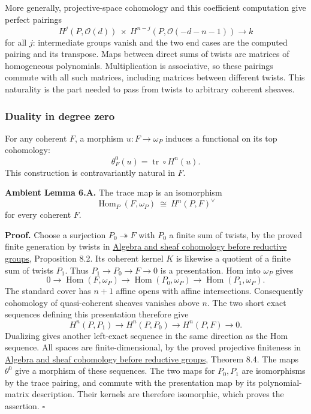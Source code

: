\documentclass[11pt,a4paper,openany]{report}
\begin{document}
More generally, projective-space cohomology and this coefficient computation give perfect pairings \[
H^j(P,\mathcal O(d))\ \times\
H^{n-j}(P,\mathcal O(-d-n-1))\longrightarrow k
\] for all \(j\): intermediate groups vanish and the two end cases are the computed pairing and its transpose. Maps between direct sums of twists are matrices of homogeneous polynomials. Multiplication is associative, so these pairings commute with all such matrices, including matrices between different twists. This naturality is the part needed to pass from twists to arbitrary coherent sheaves.

\subsubsection{Duality in degree zero}\label{AG-RG-S02-duality-in-degree-zero}

For any coherent \(F\), a morphism \(u:F\to\omega_P\) induces a functional on its top cohomology: \[
\theta_F^0(u)=\operatorname{tr}\circ H^n(u).
\] This construction is contravariantly natural in \(F\).

\textbf{Ambient Lemma 6.A.} The trace map is an isomorphism \[
\operatorname{Hom}_P(F,\omega_P)
 \ \cong\ H^n(P,F)^\vee
\] for every coherent \(F\).

\textbf{Proof.} Choose a surjection \(P_0\twoheadrightarrow F\) with \(P_0\) a finite sum of twists, by the proved finite generation by twists in \href{https://github.com/KokunoYumeto/open-math-courses/blob/main/docs/courses/AG-RG/AG-RG-S01.md}{Algebra and sheaf cohomology before reductive groups}, Proposition 8.2. Its coherent kernel \(K\) is likewise a quotient of a finite sum of twists \(P_1\). Thus \(P_1\to P_0\to F\to0\) is a presentation. Hom into \(\omega_P\) gives \[
0\to\operatorname{Hom}(F,\omega_P)
 \to\operatorname{Hom}(P_0,\omega_P)
 \to\operatorname{Hom}(P_1,\omega_P).
\] The standard cover has \(n+1\) affine opens with affine intersections. Consequently cohomology of quasi-coherent sheaves vanishes above \(n\). The two short exact sequences defining this presentation therefore give \[
H^n(P,P_1)\to H^n(P,P_0)\to H^n(P,F)\to0.
\] Dualizing gives another left-exact sequence in the same direction as the Hom sequence. All spaces are finite-dimensional, by the proved projective finiteness in \href{https://github.com/KokunoYumeto/open-math-courses/blob/main/docs/courses/AG-RG/AG-RG-S01.md}{Algebra and sheaf cohomology before reductive groups}, Theorem 8.4. The maps \(\theta^0\) give a morphism of these sequences. The two maps for \(P_0,P_1\) are isomorphisms by the trace pairing, and commute with the presentation map by its polynomial-matrix description. Their kernels are therefore isomorphic, which proves the assertion. \(\square\)
\end{document}
